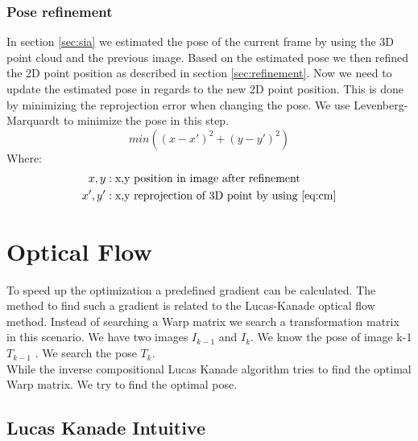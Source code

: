 \documentclass[11pt,a4paper,titlepage,oneside]{report}
\begin{document}
\subsubsection{Pose refinement}
In section \ref{sec:sia} we estimated the pose of the current frame by using the 3D point cloud and the previous image. Based on the estimated pose we then refined the 2D point position as described in section \ref{sec:refinement}. Now we need to update the estimated pose in regards to the new 2D point position. This is done by minimizing the reprojection error when changing the pose. We use Levenberg-Marquardt to minimize the pose in this step.
\begin{equation}\label{eq:pose_refinement}
	min((x - x')^2 + (y -y')^2)
\end{equation}
Where:
\begin{align*}
	x,y		&: \text{x,y position in image after refinement}\\
	x',y' &: \text{x,y reprojection of 3D point by using \ref{eq:cm}}
\end{align*}

\section{Optical Flow}
To speed up the optimization a predefined gradient can be calculated. The method to find such a gradient is related to the Lucas-Kanade optical flow method. Instead of searching a Warp matrix we search a transformation matrix in this scenario. We have two images $I_{k-1}$ and $I_{k}$. We know the pose of image k-1 $T_{k-1}$ . We search the pose $T_k$.\\
While the inverse compositional Lucas Kanade algorithm tries to find the optimal Warp matrix. We try to find the optimal pose.
\subsection{Lucas Kanade Intuitive}
\end{document}
